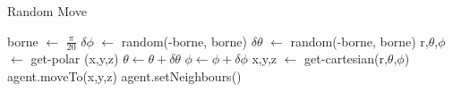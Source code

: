 \begin{algorithm}[H]
\caption{Random Move}

\begin{algorithmic}

\STATE borne $\leftarrow$ $\frac{\pi}{20} $
\STATE $\delta\phi$ $\leftarrow$ random(-borne, borne)
\STATE $\delta\theta$ $\leftarrow$ random(-borne, borne)
\STATE r,$\theta$,$\phi$ $\leftarrow$ get-polar (x,y,z)
\STATE $\theta \leftarrow \theta + \delta\theta$
\STATE $\phi \leftarrow \phi + \delta\phi$
\STATE x,y,z $\leftarrow$ get-cartesian(r,$\theta$,$\phi$)
\STATE agent.moveTo(x,y,z)
\STATE agent.setNeighbours()
\ENDIF
\end{algorithmic}


\end{algorithm}
 